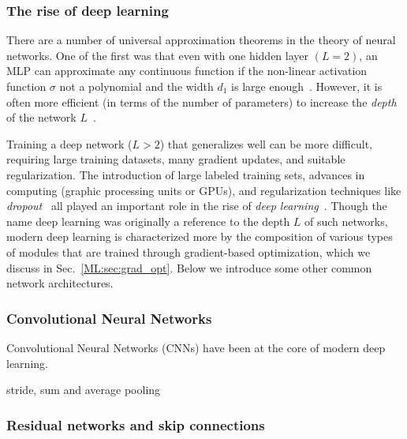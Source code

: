 \subsubsection{The rise of deep learning}\label{ML:sec:deep_learning}

There are a number of universal approximation theorems in the theory of neural networks. One of the first was that even with one hidden layer $(L=2)$, an MLP can approximate any continuous function if the non-linear activation function $\sigma$ not a polynomial and the width $d_1$ is large enough~\cite{cybenko1989approximation}. However, it is often more efficient (in terms of the number of parameters) to increase the \textit{depth} of the network $L$~\cite{NIPS2011_8e6b42f1}. 

Training a deep network (\ie $L>2$) that generalizes well can be more difficult, requiring large training datasets, many gradient updates, and suitable regularization. The introduction of large labeled training sets, advances in computing (\eg graphic processing units or GPUs), and regularization techniques like \textit{dropout}~\cite{dropout} all played an important role in the rise of \textit{deep learning}~\cite{lecun_2018, schmidhuber2015deep}. Though the name deep learning was originally a reference to the depth $L$ of such networks, modern deep learning is characterized more by the composition of various types of modules that are trained through gradient-based optimization, which we discuss in Sec.~\ref{ML:sec:grad_opt}. Below we introduce some other common network architectures. 

\subsubsection{Convolutional Neural Networks}\label{ML:sec:cnn}
Convolutional Neural Networks (CNNs) have been at the core of modern deep learning. 





stride, sum and average pooling


\subsubsection{Residual networks and skip connections}\label{ML:sec:resnet}

